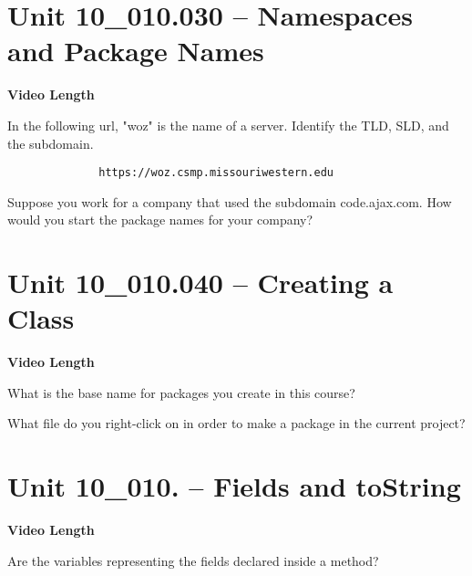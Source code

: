 \documentclass[letterpaper,12pt]{exam}
\newcommand{\unit}{Unit 10}
\begin{document}
\begin{questions}
\section*{\unit\_010.030 -- Namespaces and Package Names} 
\par{\selectfont\textbf{Video Length }}

\begin{samepage}
    \question In the following url, "woz" is the name of a server.  Identify the TLD, SLD, and the subdomain.
    \begin{verbatim}
              https://woz.csmp.missouriwestern.edu
    \end{verbatim}
    \vspace{5mm}
\end{samepage}

\begin{samepage}
    \question Suppose you work for a company that used the subdomain code.ajax.com.  How would you start the package names for your company?
    \vspace{5mm}
\end{samepage}


\section*{\unit\_010.040 -- Creating a Class} 
\par{\selectfont\textbf{Video Length }}

\begin{samepage}
    \question What is the base name for packages you create in this course?
    \vspace{5mm}
\end{samepage}

\begin{samepage}
    \question What file do you right-click on in order to make a package in the current project?
    \vspace{5mm}
\end{samepage}


\section*{\unit\_010. -- Fields and toString} 
\par{\selectfont\textbf{Video Length }}

\begin{samepage}
    \question Are the variables representing the fields declared inside a method?


\end{samepage}
\end{questions}
\end{document}
